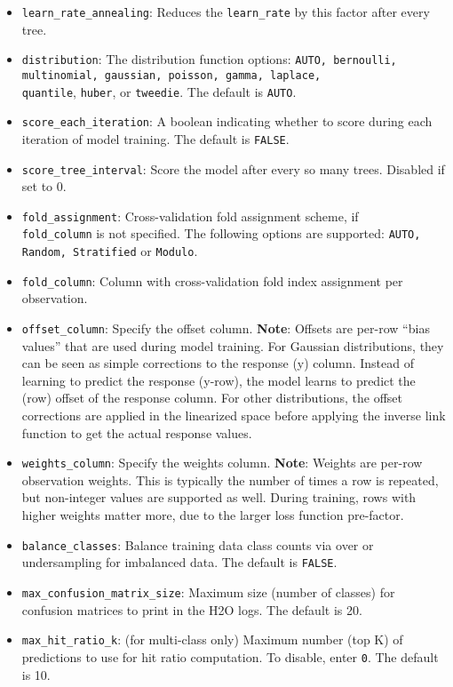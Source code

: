 \begin{itemize}
\item {\texttt{learn\_rate\_annealing}}: Reduces the {\texttt{learn\_rate}} by this factor after every tree. 
\item {\texttt{distribution}}: The distribution function options: \texttt{AUTO, bernoulli, multinomial, gaussian, poisson, gamma, laplace,} \\\texttt{quantile}, \texttt{huber}, or {\texttt{tweedie}}. The default is {\texttt{AUTO}}.
\item {\texttt{score\_each\_iteration}}: A boolean indicating whether to score during each iteration of model training.  The default is  {\texttt{FALSE}}.
\item {\texttt{score\_tree\_interval}}: Score the model after every so many trees. Disabled if set to 0.
\item \texttt{fold\_assignment}: Cross-validation fold assignment scheme, if  \\ \texttt{fold\_column} is not specified. The following options are supported: \texttt{AUTO, Random, Stratified} or \texttt{Modulo}. 
\item \texttt{fold\_column}:  Column with cross-validation fold index assignment per observation. 
\item \texttt{offset\_column}: Specify the offset column. {\textbf{Note}}: Offsets are per-row “bias values” that are used during model training. For Gaussian distributions, they can be seen as simple corrections to the response (y) column. Instead of learning to predict the response (y-row), the model learns to predict the (row) offset of the response column. For other distributions, the offset corrections are applied in the linearized space before applying the inverse link function to get the actual response values. 
\item \texttt{weights\_column}: Specify the weights column. {\textbf{Note}}: Weights are per-row observation weights. This is typically the number of times a row is repeated, but non-integer values are supported as well. During training, rows with higher weights matter more, due to the larger loss function pre-factor.
\item {\texttt{balance\_classes}}: Balance training data class counts via over or undersampling for imbalanced data. The default is {\texttt{FALSE}}.
\item {\texttt{max\_confusion\_matrix\_size}}: Maximum size (number of classes) for confusion matrices to print in the H2O logs.  The default is 20.
\item {\texttt{max\_hit\_ratio\_k}}: (for multi-class only) Maximum number (top K) of predictions to use for hit ratio computation.  To disable, enter  {\texttt{0}}. The default is 10.

\end{itemize}
